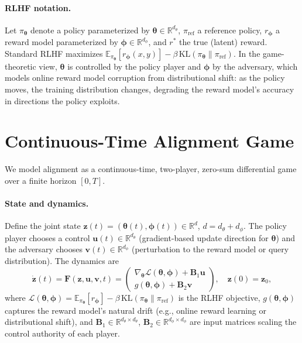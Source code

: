 \documentclass[10pt]{article}
\newcommand{\btheta}{\bm{\theta}}
\newcommand{\bphi}{\bm{\phi}}
\newcommand{\bz}{\bm{z}}
\newcommand{\bu}{\bm{u}}
\newcommand{\bv}{\bm{v}}
\newcommand{\bB}{\bm{B}}
\newcommand{\bF}{\bm{F}}
\newcommand{\cL}{\mathcal{L}}
\newcommand{\R}{\mathbb{R}}
\newcommand{\E}{\mathbb{E}}
\newcommand{\KL}{\mathrm{KL}}
\begin{document}
\paragraph{RLHF notation.}
Let $\pi_\btheta$ denote a policy parameterized by $\btheta \in \R^{d_\theta}$, $\pi_{\mathrm{ref}}$ a reference policy, $r_\bphi$ a reward model parameterized by $\bphi \in \R^{d_\phi}$, and $r^*$ the true (latent) reward.
Standard RLHF maximizes $\E_{\pi_\btheta}[r_\bphi(x,y)] - \beta\,\KL(\pi_\btheta \| \pi_{\mathrm{ref}})$.
In the game-theoretic view, $\btheta$ is controlled by the policy player and $\bphi$ by the adversary, which models online reward model corruption from distributional shift: as the policy moves, the training distribution changes, degrading the reward model's accuracy in directions the policy exploits.

\section{Continuous-Time Alignment Game}
\label{sec:game}

We model alignment as a continuous-time, two-player, zero-sum differential game over a finite horizon $[0, T]$.

\paragraph{State and dynamics.}
Define the joint state $\bz(t) = (\btheta(t), \bphi(t)) \in \R^d$, $d = d_\theta + d_\phi$.
The policy player chooses a control $\bu(t) \in \R^{d_\theta}$ (gradient-based update direction for $\btheta$) and the adversary chooses $\bv(t) \in \R^{d_\phi}$ (perturbation to the reward model or query distribution).
The dynamics are
\begin{equation}
  \dot{\bz}(t) = \bF(\bz, \bu, \bv, t) =
  \begin{pmatrix}
    \nabla_\btheta \cL(\btheta, \bphi) + \bB_1 \bu \\[3pt]
    g(\btheta, \bphi) + \bB_2 \bv
  \end{pmatrix},
  \quad \bz(0) = \bz_0,
  \label{eq:dynamics}
\end{equation}
where $\cL(\btheta, \bphi) = \E_{\pi_\btheta}[r_\bphi] - \beta\,\KL(\pi_\btheta \| \pi_{\mathrm{ref}})$ is the RLHF objective, $g(\btheta, \bphi)$ captures the reward model's natural drift (e.g., online reward learning or distributional shift), and $\bB_1 \in \R^{d_\theta \times d_\theta}$, $\bB_2 \in \R^{d_\phi \times d_\phi}$ are input matrices scaling the control authority of each player.
\end{document}
